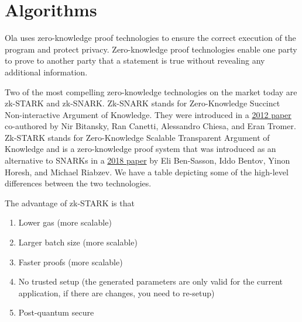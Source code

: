 \section{Algorithms} \label{sec:algorithms}
Ola uses zero-knowledge proof technologies to ensure the correct execution of the program and protect privacy. Zero-knowledge proof technologies enable one party to prove to another party that a statement is true without revealing any additional information. 

Two of the most compelling zero-knowledge technologies on the market today are zk-STARK and zk-SNARK. Zk-SNARK stands for Zero-Knowledge Succinct Non-interactive Argument of Knowledge. They were introduced in a \href{https://dl.acm.org/doi/10.1145/2090236.2090263}{2012 paper} co-authored by Nir Bitansky, Ran Canetti, Alessandro Chiesa, and Eran Tromer. Zk-STARK stands for Zero-Knowledge Scalable Transparent Argument of Knowledge and is a zero-knowledge proof system that was introduced as an alternative to SNARKs in a \href{https://starkware.co/wp-content/uploads/2022/05/STARK-paper.pdf}{2018 paper} by Eli Ben-Sasson, Iddo Bentov, Yinon Horesh, and Michael Riabzev. We have a table depicting some of the high-level differences between the two technologies.

\begin{table}[!ht]
    \centering {}
\end{table}

\noindent The advantage of zk-STARK is that
\begin{enumerate}
    \item Lower gas (more scalable)
    \item Larger batch size (more scalable)
    \item Faster proofs (more scalable)
    \item No trusted setup (the generated parameters are only valid for the current application, if there are changes, you need to re-setup)
    \item Post-quantum secure
\end{enumerate}

